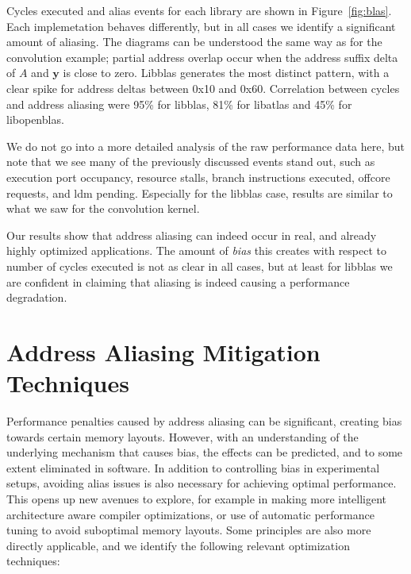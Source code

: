 \documentclass[10pt, conference, compsocconf]{IEEEtran}
\begin{document}
Cycles executed and alias events for each library are shown in Figure~\ref{fig:blas}.
Each implemetation behaves differently, but in all cases we identify a significant amount of aliasing.
The diagrams can be understood the same way as for the convolution example; partial address overlap occur when the address suffix delta of $A$ and $\boldsymbol{y}$ is close to zero.
Libblas generates the most distinct pattern, with a clear spike for address deltas between 0x10 and 0x60.
Correlation between cycles and address aliasing were 95\% for libblas, 81\% for libatlas and 45\% for libopenblas.

We do not go into a more detailed analysis of the raw performance data here, but note that we see many of the previously discussed events stand out, such as execution port occupancy, resource stalls, branch instructions executed, offcore requests, and ldm pending.
Especially for the libblas case, results are similar to what we saw for the convolution kernel.

Our results show that address aliasing can indeed occur in real, and already highly optimized applications.
The amount of \emph{bias} this creates with respect to number of cycles executed is not as clear in all cases, but at least for libblas we are confident in claiming that aliasing is indeed causing a performance degradation.


\section{Address Aliasing Mitigation Techniques}
\label{sec:mitigation}
Performance penalties caused by address aliasing can be significant, creating bias towards certain memory layouts.
However, with an understanding of the underlying mechanism that causes bias, the effects can be predicted, and to some extent eliminated in software.
In addition to controlling bias in experimental setups, avoiding alias issues is also necessary for achieving optimal performance.
This opens up new avenues to explore, for example in making more intelligent architecture aware compiler optimizations, or use of automatic performance tuning to avoid suboptimal memory layouts.
Some principles are also more directly applicable, and we identify the following relevant optimization techniques:
\end{document}
